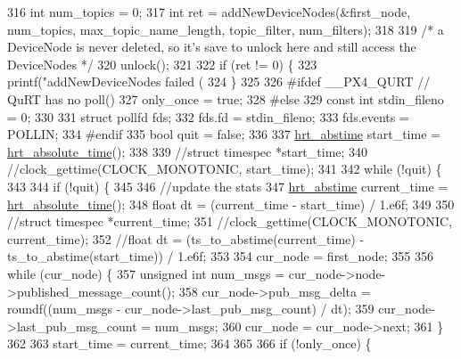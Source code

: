 \begin{DoxyCode}
316     \textcolor{keywordtype}{int} num\_topics = 0;
317     \textcolor{keywordtype}{int} ret = addNewDeviceNodes(&first\_node, num\_topics, max\_topic\_name\_length, topic\_filter, num\_filters);
318 
319     \textcolor{comment}{/* a DeviceNode is never deleted, so it's save to unlock here and still access the DeviceNodes */}
320     unlock();
321 
322     \textcolor{keywordflow}{if} (ret != 0) \{
323         printf(\textcolor{stringliteral}{"addNewDeviceNodes failed (%
324     \}
325 
326 \textcolor{preprocessor}{#ifdef \_\_PX4\_QURT // QuRT has no poll()}
327     only\_once = \textcolor{keyword}{true};
328 \textcolor{preprocessor}{#else}
329     \textcolor{keyword}{const} \textcolor{keywordtype}{int} stdin\_fileno = 0;
330 
331     \textcolor{keyword}{struct }pollfd fds;
332     fds.fd = stdin\_fileno;
333     fds.events = POLLIN;
334 \textcolor{preprocessor}{#endif}
335     \textcolor{keywordtype}{bool} quit = \textcolor{keyword}{false};
336 
337     \hyperlink{drv__hrt_8h_a9f8bbf0e883115e04a457a268533a87c}{hrt\_abstime} start\_time = \hyperlink{drv__hrt_8h_a91f4291796ed7fbe544dc22ee5288367}{hrt\_absolute\_time}();
338 
339     \textcolor{comment}{//struct timespec *start\_time;}
340     \textcolor{comment}{//clock\_gettime(CLOCK\_MONOTONIC, start\_time);}
341 
342     \textcolor{keywordflow}{while} (!quit) \{
343 
344         \textcolor{keywordflow}{if} (!quit) \{
345 
346             \textcolor{comment}{//update the stats}
347             \hyperlink{drv__hrt_8h_a9f8bbf0e883115e04a457a268533a87c}{hrt\_abstime} current\_time = \hyperlink{drv__hrt_8h_a91f4291796ed7fbe544dc22ee5288367}{hrt\_absolute\_time}();
348             \textcolor{keywordtype}{float} dt = (current\_time - start\_time) / 1.e6f;
349 
350             \textcolor{comment}{//struct timespec *current\_time;}
351             \textcolor{comment}{//clock\_gettime(CLOCK\_MONOTONIC, current\_time);}
352             \textcolor{comment}{//float dt = (ts\_to\_abstime(current\_time) - ts\_to\_abstime(start\_time)) / 1.e6f;}
353             
354             cur\_node = first\_node;
355 
356             \textcolor{keywordflow}{while} (cur\_node) \{
357                 \textcolor{keywordtype}{unsigned} \textcolor{keywordtype}{int} num\_msgs = cur\_node->node->published\_message\_count();
358                 cur\_node->pub\_msg\_delta = roundf((num\_msgs - cur\_node->last\_pub\_msg\_count) / dt);
359                 cur\_node->last\_pub\_msg\_count = num\_msgs;
360                 cur\_node = cur\_node->next;
361             \}
362 
363             start\_time = current\_time;
364 
365 
366             \textcolor{keywordflow}{if} (!only\_once) \{
}
\end{DoxyCode}
